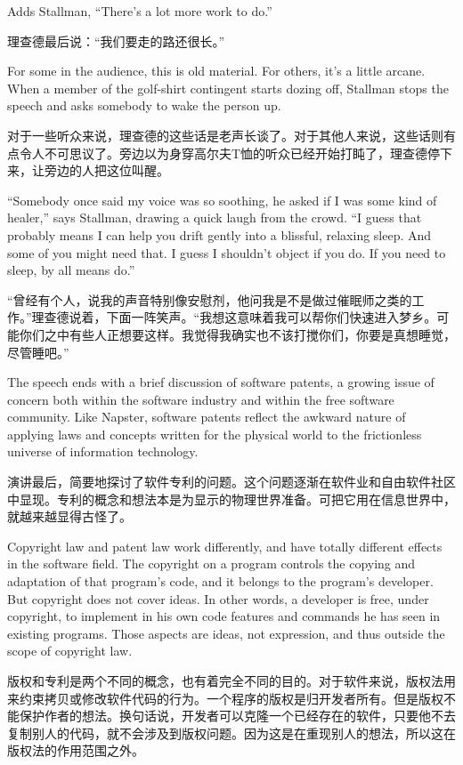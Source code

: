 \ifdefined\eng
Adds Stallman, ``There's a lot more work to do.''
\fi

\ifdefined\chs
理查德最后说：“我们要走的路还很长。”
\fi

\ifdefined\eng
For some in the audience, this is old material. For others, it's a little arcane. When a member of the golf-shirt contingent starts dozing off, Stallman stops the speech and asks somebody to wake the person up.
\fi

\ifdefined\chs
对于一些听众来说，理查德的这些话是老声长谈了。对于其他人来说，这些话则有点令人不可思议了。旁边以为身穿高尔夫T恤的听众已经开始打盹了，理查德停下来，让旁边的人把这位叫醒。
\fi

\ifdefined\eng
``Somebody once said my voice was so soothing, he asked if I was some kind of healer,'' says Stallman, drawing a quick laugh from the crowd. ``I guess that probably means I can help you drift gently into a blissful, relaxing sleep. And some of you might need that. I guess I shouldn't object if you do. If you need to sleep, by all means do.''
\fi

\ifdefined\chs
“曾经有个人，说我的声音特别像安慰剂，他问我是不是做过催眠师之类的工作。”理查德说着，下面一阵笑声。“我想这意味着我可以帮你们快速进入梦乡。可能你们之中有些人正想要这样。我觉得我确实也不该打搅你们，你要是真想睡觉，尽管睡吧。”
\fi

\ifdefined\eng
The speech ends with a brief discussion of software patents, a growing issue of concern both within the software industry and within the free software community. Like Napster, software patents reflect the awkward nature of applying laws and concepts written for the physical world to the frictionless universe of information technology.
\fi

\ifdefined\chs
演讲最后，简要地探讨了软件专利的问题。这个问题逐渐在软件业和自由软件社区中显现。专利的概念和想法本是为显示的物理世界准备。可把它用在信息世界中，就越来越显得古怪了。
\fi

\ifdefined\eng
Copyright law and patent law work differently, and have totally different effects in the software field.  The copyright on a program controls the copying and adaptation of that program's code, and it belongs to the program's developer.  But copyright does not cover ideas. In other words, a developer is free, under copyright, to implement in his own code features and commands he has seen in existing programs.  Those aspects are ideas, not expression, and thus outside the scope of copyright law.
\fi

\ifdefined\chs
版权和专利是两个不同的概念，也有着完全不同的目的。对于软件来说，版权法用来约束拷贝或修改软件代码的行为。一个程序的版权是归开发者所有。但是版权不能保护作者的想法。换句话说，开发者可以克隆一个已经存在的软件，只要他不去复制别人的代码，就不会涉及到版权问题。因为这是在重现别人的想法，所以这在版权法的作用范围之外。
\fi


